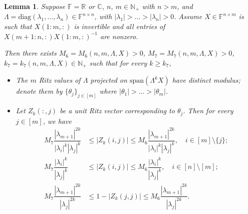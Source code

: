 \documentclass[11pt,a4paper]{article}
\theoremstyle{plain}              %
\newtheorem{lemma}[theorem]{Lemma}
\theoremstyle{definition}         %
\begin{document}
\begin{lemma}\label{lemma:withRR}
Suppose \(\mathbb{F}=\mathbb{R}\) or \(\mathbb{C}\), \(n\), \(m\in\mathbb{N}_+\) with \(n>m\), and \(\Lambda=\mathrm{diag}(\lambda_1,\dots,\lambda_n)\in\mathbb{F}^{n\times n}\), with \(|\lambda_1|>\dots>|\lambda_n|>0\). Assume \(X\in\mathbb{F}^{n\times m}\) is such that \(X(1:m,:)\) is invertible and all entries of \(X(m+1:n,:)X(1:m,:)^{-1}\) are nonzero. 

Then there exists \(M_6=M_6(n,m,\Lambda,X)>0\), \(M_7=M_7(n,m,\Lambda,X)>0\), \(k_7=k_7(n,m,\Lambda,X)\in\mathbb{N}_+\) such that for every \(k\geq k_7\),

\begin{itemize}
\item The \(m\) Ritz values of \(\Lambda\) projected on \(\mathrm{span}(\Lambda^kX)\) have distinct modulus; denote them by \(\{\theta_j\}_{j\in[m]}\) where \(|\theta_1|>\dots>|\theta_m|\).
\item Let \(Z_k(:,j)\) be a unit Ritz vector corresponding to \(\theta_j\). Then for every \(j\in[m]\), we have
\begin{align*}
M_7\dfrac{|\lambda_{m+1}|^{2k}}{|\lambda_i|^k|\lambda_j|^k}&\leq|Z_k(i,j)|\leq M_6\dfrac{|\lambda_{m+1}|^{2k}}{|\lambda_i|^k|\lambda_j|^k},\quad i\in[m]\setminus\{j\};\\
M_7\dfrac{|\lambda_i|^k}{|\lambda_j|^k}&\leq|Z_k(i,j)|\leq M_6\dfrac{|\lambda_i|^k}{|\lambda_j|^k},\quad i\in[n]\setminus[m];\\
M_7\dfrac{|\lambda_{m+1}|^{2k}}{|\lambda_j|^{2k}}&\leq1-|Z_k(j,j)|\leq M_6\dfrac{|\lambda_{m+1}|^{2k}}{|\lambda_j|^{2k}}.
\end{align*}
\end{itemize}
\end{lemma}
\end{document}
